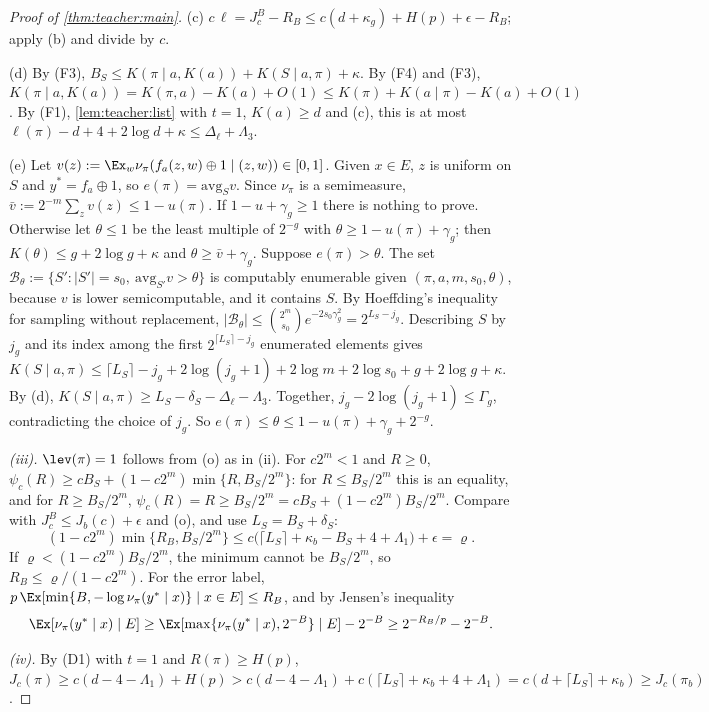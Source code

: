\begin{proof}[Proof of \cref{thm:teacher:main}]
(c) $c\,\ell=J^B_c-R_B\le c(d+\kappa_g)+H(p)+\epsilon-R_B$; apply (b) and divide by $c$.

(d) By (F3), $B_S\le K(\pi\mid a,K(a))+K(S\mid a,\pi)+\kappa$. By (F4) and (F3), $K(\pi\mid a,K(a))=K(\pi,a)-K(a)+O(1)\le K(\pi)+K(a\mid\pi)-K(a)+O(1)$. By (F1), \cref{lem:teacher:list} with $t=1$, $K(a)\ge d$ and (c), this is at most $\ell(\pi)-d+4+2\log d+\kappa\le\Delta_\ell+\Lambda_3$.

(e) Let $v(z):=\Ex_w\nu_\pi(f_a(z,w)\oplus1\mid(z,w))\in[0,1]$. Given $x\in E$, $z$ is uniform on $S$ and $y^*=f_a\oplus1$, so $e(\pi)=\mathrm{avg}_Sv$. Since $\nu_\pi$ is a semimeasure, $\bar v:=2^{-m}\sum_zv(z)\le1-u(\pi)$. If $1-u+\gamma_g\ge1$ there is nothing to prove. Otherwise let $\theta\le1$ be the least multiple of $2^{-g}$ with $\theta\ge1-u(\pi)+\gamma_g$; then $K(\theta)\le g+2\log g+\kappa$ and $\theta\ge\bar v+\gamma_g$. Suppose $e(\pi)>\theta$. The set $\mathcal B_\theta:=\{S':|S'|=s_0,\ \mathrm{avg}_{S'}v>\theta\}$ is computably enumerable given $(\pi,a,m,s_0,\theta)$, because $v$ is lower semicomputable, and it contains $S$. By Hoeffding's inequality for sampling without replacement, $|\mathcal B_\theta|\le\binom{2^m}{s_0}e^{-2s_0\gamma_g^2}=2^{L_S-j_g}$. Describing $S$ by $j_g$ and its index among the first $2^{\lceil L_S\rceil-j_g}$ enumerated elements gives $K(S\mid a,\pi)\le\lceil L_S\rceil-j_g+2\log(j_g+1)+2\log m+2\log s_0+g+2\log g+\kappa$. By (d), $K(S\mid a,\pi)\ge L_S-\delta_S-\Delta_\ell-\Lambda_3$. Together, $j_g-2\log(j_g+1)\le\Gamma_g$, contradicting the choice of $j_g$. So $e(\pi)\le\theta\le1-u(\pi)+\gamma_g+2^{-g}$.

\emph{(iii).} $\lev(\pi)=1$ follows from (o) as in (ii). For $c2^m<1$ and $R\ge0$, $\psi_c(R)\ge cB_S+(1-c2^m)\min\{R,B_S/2^m\}$: for $R\le B_S/2^m$ this is an equality, and for $R\ge B_S/2^m$, $\psi_c(R)=R\ge B_S/2^m=cB_S+(1-c2^m)B_S/2^m$. Compare with $J^B_c\le J_b(c)+\epsilon$ and (o), and use $L_S=B_S+\delta_S$:
\[
(1-c2^m)\min\{R_B,B_S/2^m\}\le c\big(\lceil L_S\rceil+\kappa_b-B_S+4+\Lambda_1\big)+\epsilon=\varrho.
\]
If $\varrho<(1-c2^m)B_S/2^m$, the minimum cannot be $B_S/2^m$, so $R_B\le\varrho/(1-c2^m)$. For the error label, $p\,\Ex[\min\{B,-\log\nu_\pi(y^*\mid x)\}\mid x\in E]\le R_B$, and by Jensen's inequality
\[
\Ex[\nu_\pi(y^*\mid x)\mid E]\ge\Ex[\max\{\nu_\pi(y^*\mid x),2^{-B}\}\mid E]-2^{-B}\ge2^{-R_B/p}-2^{-B}.
\]

\emph{(iv).} By (D1) with $t=1$ and $R(\pi)\ge H(p)$, $J_c(\pi)\ge c(d-4-\Lambda_1)+H(p)>c(d-4-\Lambda_1)+c(\lceil L_S\rceil+\kappa_b+4+\Lambda_1)=c(d+\lceil L_S\rceil+\kappa_b)\ge J_c(\pi_b)$.
\end{proof}

